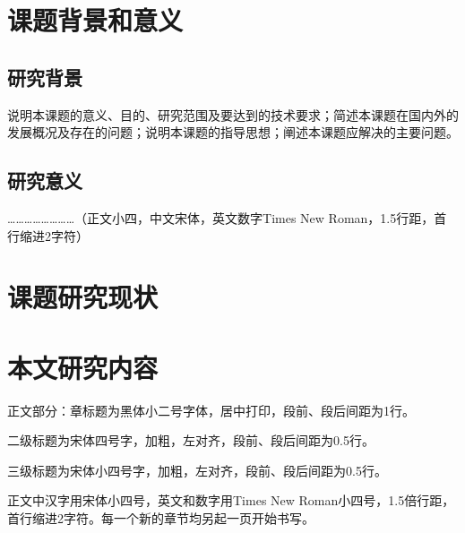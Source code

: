 ﻿%
%
%


\section{课题背景和意义}

\subsection{研究背景}

说明本课题的意义、目的、研究范围及要达到的技术要求；简述本课题在国内外的发展概况及存在的问题；说明本课题的指导思想；阐述本课题应解决的主要问题。

\subsection{研究意义}

……………………（正文小四，中文宋体，英文数字Times New Roman，1.5行距，首行缩进2字符）

\section{课题研究现状}

\section{本文研究内容}

正文部分：章标题为黑体小二号字体，居中打印，段前、段后间距为1行。

二级标题为宋体四号字，加粗，左对齐，段前、段后间距为0.5行。

三级标题为宋体小四号字，加粗，左对齐，段前、段后间距为0.5行。

正文中汉字用宋体小四号，英文和数字用Times New Roman小四号，1.5倍行距，首行缩进2字符。每一个新的章节均另起一页开始书写。


